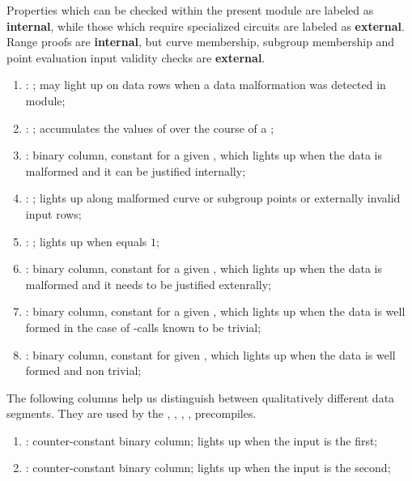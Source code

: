 Properties which can be checked within the present module are labeled as \textbf{internal}, while those which require specialized circuits are labeled as \textbf{external}. Range proofs are \textbf{internal}, but curve membership, subgroup membership and point evaluation input validity checks are \textbf{external}.
\begin{enumerate}[resume]
    \item
        \both{\malformedDataInternalBit}:
        \ccbc{};
        may light up on data rows when a data malformation was detected in module;
    \item
        \both{\malformedDataInternalAcc}:
        \ccbc{};
        accumulates the values of \malformedDataInternalBit{} over the course of a \blsId{};
    \item
        \both{\malformedDataInternalTot}:
        binary column, constant for a given \blsId{},
        which lights up when the data is malformed and it can be justified internally;
    \item
        \blsPrediction{}
        \both{\malformedDataExternalBit}:
        \ccbc{};
        lights up along malformed curve or subgroup points or externally invalid \instPointEvaluation{} input rows;
    \item
        \both{\malformedDataExternalAcc}:
        \ccbc{};
        lights up when \malformedDataExternalBit{} equals $1$;
    \item
        \both{\malformedDataExternalTot}:
        binary column, constant for a given \blsId, which lights up when the data is malformed and it needs to be justified extenrally;
    \item
        \both{\wellformedDataTrivial}:
        binary column, constant for a given \blsId, which lights up when the data is well formed in the case of \instBlsPairingCheck-calls known to be trivial;
    \item
        \both{\wellformedDataNontrivial}:
        binary column, constant for  given \blsId, which lights up when the data is well formed and non trivial;
\end{enumerate}
The following columns help us distinguish between qualitatively different data segments.
They are used by the
\instBlsGOneAdd{},
\instBlsGOneMsm{},
\instBlsGTwoAdd{},
\instBlsGTwoMsm{},
\instBlsPairingCheck{}
precompiles.
\begin{enumerate}[resume]
    \item
        \isFirstInput:
        counter-constant binary column;
        lights up when the input is the first;
    \item
        \isSecondInput:
        counter-constant binary column;
        lights up when the input is the second;
\end{enumerate}
